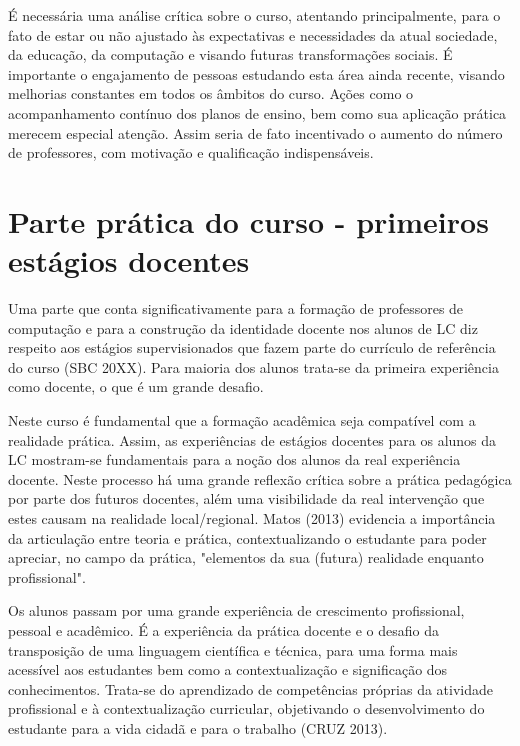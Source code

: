     
    É necessária uma análise crítica sobre o curso, atentando principalmente, para o fato de estar ou não ajustado às expectativas e necessidades da atual sociedade, da educação, da computação e visando futuras transformações sociais. É importante o engajamento de pessoas estudando esta área ainda recente, visando melhorias constantes em todos os âmbitos do curso. Ações como o acompanhamento contínuo dos planos de ensino, bem como sua aplicação prática merecem especial atenção. Assim seria de fato incentivado o aumento do número de professores, com motivação e qualificação indispensáveis.
 
 
 
\section{Parte prática do curso - primeiros estágios docentes}%
 
	Uma parte que conta significativamente para a formação de professores de computação e para a construção da identidade docente nos alunos de LC diz respeito aos estágios supervisionados que fazem parte do currículo de referência do curso (SBC 20XX). Para maioria dos alunos trata-se da primeira experiência como docente, o que é um grande desafio.
	
    
    Neste curso é fundamental que a formação acadêmica seja compatível com a realidade prática. Assim, as experiências de estágios docentes para os alunos da LC mostram-se fundamentais para a noção dos alunos da real experiência docente. Neste processo há uma grande reflexão crítica sobre a prática pedagógica por parte dos futuros docentes, além uma visibilidade da real intervenção que estes causam na realidade local/regional. Matos (2013) evidencia a importância da articulação entre teoria e prática, contextualizando o estudante para poder apreciar, no campo da prática, "elementos da sua (futura) realidade enquanto profissional".
	
    
    Os alunos passam por uma grande experiência de crescimento profissional, pessoal e acadêmico. É a experiência da prática docente e o desafio da transposição de uma linguagem científica e técnica, para uma forma mais acessível aos estudantes bem como a contextualização e significação dos conhecimentos. Trata-se do aprendizado de competências próprias da atividade profissional e à contextualização curricular, objetivando o desenvolvimento do estudante para a vida cidadã e para o trabalho (CRUZ 2013). 
	
